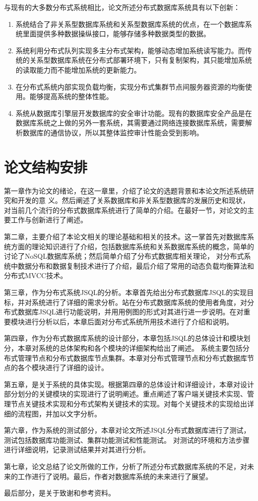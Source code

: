与现有的大多数分布式系统相比，论文所述分布式数据库系统具有以下创新：
\begin{enumerate}[fullwidth,itemindent=2em]
	\item 系统结合了非关系型数据库系统和关系型数据库系统的优点，在一个数据库系统里面提供多种数据操纵接口，能够存储多种数据类型的数据。
	\item 系统利用分布式队列实现多主分布式架构，能够动态增加系统读写能力。而传统的关系型数据库系统在分布式部署环境下，只有复制架构，其只能增加系统的读取能力而不能增加系统的更新能力。
	\item 在分布式系统内部实现负载均衡，实现分布式集群节点间服务器资源的均衡使用。能够提高系统的整体性能。
	\item 系统从数据库引擎层开发数据库的安全审计功能。现有的数据库安全产品是在数据库系统之上做的另外一套系统，其需要通过网络连接数据库系统，需要解析数据库的通信协议，所以其整体监控审计性能会受到影响。
\end{enumerate}
\section{论文结构安排}
第一章作为论文的绪论，在这一章里，介绍了论文的选题背景和本论文所述系统研究和开发的意
义。然后阐述了关系数据库和非关系型数据库的发展历史和现状，对当前几个流行的分布式数据库系统进行了简单的介绍。在最好一节，对论文的主要工作与创新进行了阐述。

第二章，主要介绍了本论文相关的理论基础和相关的技术。这一掌首先对数据库系统方面的理论知识进行了介绍，包括数据库系统和关系数据库系统的概念，简单的讨论了NoSQL数据库系统；然后简单介绍了分布式数据库相关理论，
对分布式系统中数据分布和数据复制技术进行了介绍，最后介绍了常用的动态负载均衡算法和分布式MVCC技术。

第三章，作为分布式系统JSQL的分析。本章首先给出分布式数据库JSQL的实现目标，并对系统进行了详细的需求分析。站在分布式数据库系统的使用者角度，对分布式数据库JSQL进行功能说明，并用用例图的形式对其进行进一步说明。在对重要模块进行分析以后，本章后面对分布式系统所用技术进行了介绍和说明。

第四章，作为分布式数据库系统的设计部分，本章包括JSQL的总体设计和模块划分，本章对系统的总体架构和各个模块的详细架构给出了阐述。
系统主要包括分布式管理节点和分布式数据库节点集群。本章对分布式管理节点和分布式数据库节点的各个模块进行了详细的设计。

第五章，是关于系统的具体实现。根据第四章的总体设计和详细设计，本章对设计部分划分的关键模块的实现进行了说明阐述。重点阐述了客户端关键技术实现、管理节点关键技术实现和分布式架构关键技术的实现。对每个关键技术的实现给出详细的流程图，并加以文字分析。

第六章，作为系统的测试部分，本章对论文所述JSQL分布式数据库进行了测试，测试包括数据库功能测试、集群功能测试和性能测试。
对测试的环境和方法步骤进行详细说明，记录测试结果并对其进行分析。

第七章，论文总结了论文所做的工作，分析了所述分布式数据库系统的不足，对未来的工作进行了说明。最后，作者对数据库系统的未来进行了展望。

最后部分，是关于致谢和参考资料。